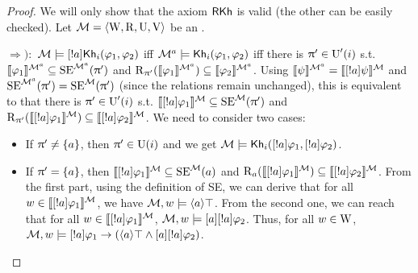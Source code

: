 \begin{proof}
We will only show that the axiom $\axm{RKh}$ is valid (the other can be easily checked). 
Let $\modults = \tup{\W, \R, \Unc, \V}$ be an \ults.

$\Rightarrow):$ $\modults \models \srefbox{a} \khi(\varphi_1,\varphi_2)$ iff $\modults^a \models \khi(\varphi_1,\varphi_2)$ iff there is $\plans' \in \Unc'(i)$ s.t. $\truthset{\modults^a}{\varphi_1} \subseteq \stexec^{\modults^a}(\plans')$ and $\R_{\plans'}(\truthset{\modults^a}{\varphi_1}) \subseteq \truthset{\modults^a}{\varphi_2}$.
Using $\truthset{\modults^a}{\psi} = \truthset{\modults}{\srefbox{a} \psi}$ and $\stexec^{\modults^a}(\plans') = \stexec^\modults(\plans')$ (since the relations remain unchanged), this is equivalent to that there is $\plans' \in \Unc'(i)$ s.t. $\truthset{\modults}{\srefbox{a} \varphi_1} \subseteq \stexec^\modults(\plans')$ and $\R_{\plans'}(\truthset{\modults}{\srefbox{a} \varphi_1}) \subseteq \truthset{\modults}{\srefbox{a} \varphi_2}$. We need to consider two cases:
\begin{itemize}
\item If $\plans' \neq \set{a}$, then $\plans' \in \Unc(i)$ and we get $\modults \models \khi(\srefbox{a}\varphi_1,\srefbox{a}\varphi_2)$.
\item If $\plans' = \set{a}$, then $\truthset{\modults}{\srefbox{a}\varphi_1} \subseteq \stexec^\modults(a)$ and $\R_a(\truthset{\modults}{\srefbox{a}\varphi_1}) \subseteq \truthset{\modults}{\srefbox{a}\varphi_2}$.
From the first part, using the definition of SE, we can derive that for all $w \in \truthset{\modults}{\srefbox{a}\varphi_1}$, we have $\modults,w \models \mldiam{a}\top$.
From the second one, we can reach that for all $w \in \truthset{\modults}{\srefbox{a}\varphi_1}$, $\modults,w \models \mlbox{a} \srefbox{a}\varphi_2$.
Thus, for all $w \in \W$, $\modults,w \models \srefbox{a} \varphi_1 \ra (\mldiam{a}\top \wedge \mlbox{a} \srefbox{a}\varphi_2)$.
\end{itemize}


\end{proof}
